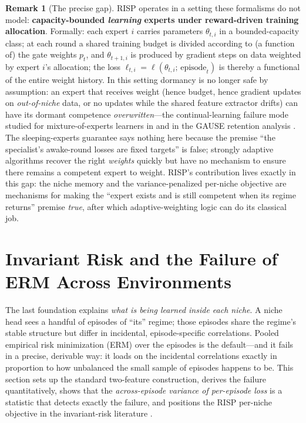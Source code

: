 \documentclass[11pt,a4paper]{article}
\theoremstyle{definition}
\newtheorem{remark}{Remark}[section]
\theoremstyle{plain}
\newcommand{\nm}{\textsc{RISP}}
\begin{document}
\begin{remark}[The precise gap]
\label{rem:dd1-gap}
\nm{} operates in a setting these formalisms do not model:
\textbf{capacity-bounded \emph{learning} experts under reward-driven
training allocation}. Formally: each expert $i$ carries parameters
$\theta_{t,i}$ in a bounded-capacity class; at each round a shared training
budget is divided according to (a function of) the gate weights $p_t$, and
$\theta_{t+1, i}$ is produced by gradient steps on data weighted by expert
$i$'s allocation; the loss $\ell_{t,i} = \ell(\theta_{t,i};\,
\text{episode}_t)$ is thereby a functional of the entire weight history. In
this setting dormancy is no longer safe by assumption: an expert that
receives weight (hence budget, hence gradient updates on
\emph{out-of-niche} data, or no updates while the shared feature extractor
drifts) can have its dormant competence \emph{overwritten}---the
continual-learning failure mode studied for mixture-of-experts learners in
\cite{li2024moecl} and in the GAUSE retention analysis \cite{li2026gause}.
The sleeping-experts guarantee says nothing here because the premise ``the
specialist's awake-round losses are fixed targets'' is false; strongly
adaptive algorithms recover the right \emph{weights} quickly but have no
mechanism to ensure there remains a competent expert to weight. \nm{}'s
contribution lives exactly in this gap: the niche memory and the
variance-penalized per-niche objective are mechanisms for making the
``expert exists and is still competent when its regime returns'' premise
\emph{true}, after which adaptive-weighting logic can do its classical job.
\end{remark}

\section{Invariant Risk and the Failure of ERM Across Environments}
\label{sec:dd1-invariance}

The last foundation explains \emph{what is being learned inside each niche}.
A niche head sees a handful of episodes of ``its'' regime; those episodes
share the regime's stable structure but differ in incidental, episode-specific
correlations. Pooled empirical risk minimization (ERM) over the episodes is
the default---and it fails in a precise, derivable way: it loads on the
incidental correlations exactly in proportion to how unbalanced the small
sample of episodes happens to be. This section sets up the standard
two-feature construction, derives the failure quantitatively, shows that the
\emph{across-episode variance of per-episode loss} is a statistic that detects
exactly the failure, and positions the \nm{} per-niche objective in the
invariant-risk literature \cite{arjovsky2019irm, krueger2021rex,
peters2016causal}.
\end{document}

